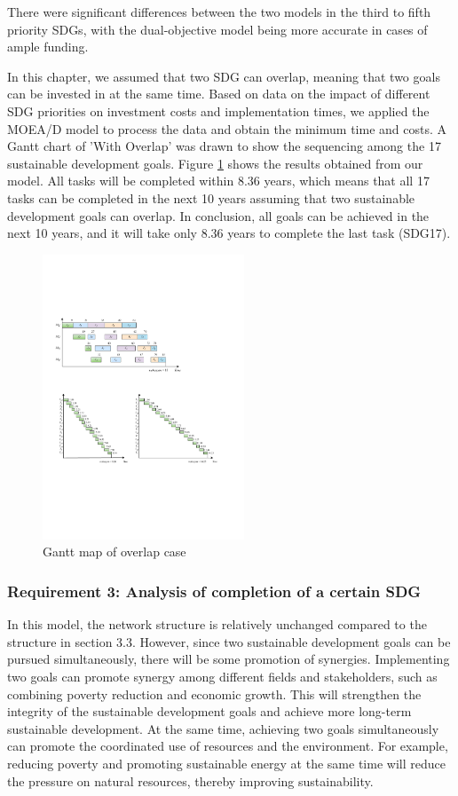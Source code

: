 \documentclass[10pt]{mcmthesis}
\begin{document}
There were significant differences between the two models in the third to fifth priority SDGs, with the dual-objective model being more accurate in cases of ample funding.

In this chapter, we assumed that two SDG can overlap, meaning that two goals can be invested in at the same time. Based on data on the impact of different SDG priorities on investment costs and implementation times, we applied the MOEA/D model to process the data and obtain the minimum time and costs. A Gantt chart of 'With Overlap' was drawn to show the sequencing among the 17 sustainable development goals. Figure \ref{fig.gantt over} shows the results obtained from our model. All tasks will be completed within 8.36 years, which means that all 17 tasks can be completed in the next 10 years assuming that two sustainable development goals can overlap. In conclusion, all goals can be achieved in the next 10 years, and it will take only 8.36 years to complete the last task (SDG17).

\begin{figure}[H]
    \centering
    \includegraphics[width=6.0cm]{figures/Overlap-Gantt.pdf}
    \caption{ Gantt map of overlap case }%
    \label{fig.gantt over}
\end{figure} 
\vspace{-15pt}

\subsubsection{Requirement 3: Analysis of completion of a certain SDG}
In this model, the network structure is relatively unchanged compared to the structure in section 3.3. However, since two sustainable development goals can be pursued simultaneously, there will be some promotion of synergies. Implementing two goals can promote synergy among different fields and stakeholders, such as combining poverty reduction and economic growth. This will strengthen the integrity of the sustainable development goals and achieve more long-term sustainable development.
At the same time, achieving two goals simultaneously can promote the coordinated use of resources and the environment. For example, reducing poverty and promoting sustainable energy at the same time will reduce the pressure on natural resources, thereby improving sustainability.
\end{document}

